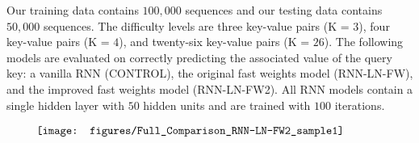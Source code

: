 \documentclass[portrait,a0b,final,a4resizeable]{include/a0poster}
\begin{document}
\begin{poster}
\begin{multicols}{3}
\begin{minipage}[c]{1\columnwidth}
        \centering
		\label{table:examples}
\end{minipage}
\vspace{0.25in}

Our training data contains $100,000$ sequences and our testing data contains $50,000$ sequences.
The difficulty levels are three key-value pairs (K = $3$), four key-value pairs (K = $4$), and twenty-six key-value pairs (K = $26$).
The following models are evaluated on correctly predicting the associated value of the query key: a vanilla RNN (CONTROL), the original fast weights model (RNN-LN-FW), and the improved fast weights model (RNN-LN-FW2).
All RNN models contain a single hidden layer with $50$ hidden units and are trained with $100$ iterations.\\

\begin{minipage}[c]{1\columnwidth}
        \centering
		\label{table:compare_methods}
\end{minipage}

\vspace{1.25in}
\vspace{-1.25in}


\newpage
{}
\vspace{-0.5cm}
\begin{align*}
\hspace{-0.475in}
\texttt{[image: figures/Full\_Comparison\_RNN-LN-FW2\_sample1]}
\end{align*}


\end{multicols}
\end{poster}
\end{document}
